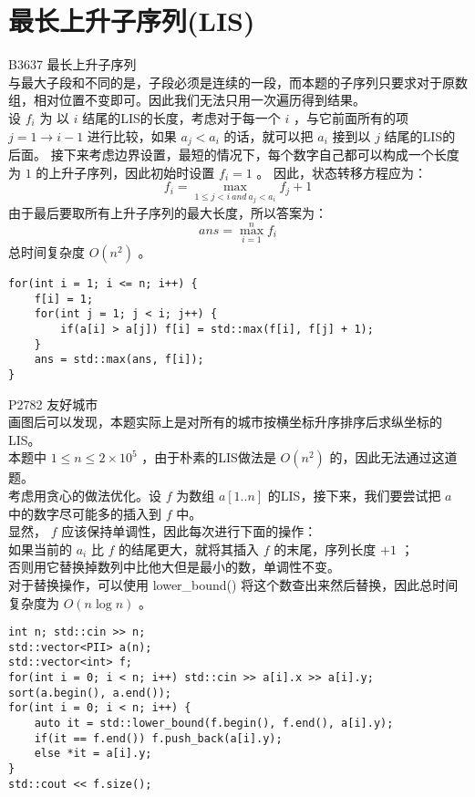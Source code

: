 \documentclass{beamer}
\begin{document}
\section{最长上升子序列(LIS)}
\begin{frame}
B3637 最长上升子序列\\
与最大子段和不同的是，子段必须是连续的一段，而本题的子序列只要求对于原数组，相对位置不变即可。因此我们无法只用一次遍历得到结果。\\ 
设 $f_i$ 为 以 $i$ 结尾的LIS的长度，考虑对于每一个 $i$ ，与它前面所有的项 $j = 1 \rightarrow i - 1$ 进行比较，如果 $a_j < a_i$ 的话，就可以把 $a_i$ 接到以 $j$ 结尾的LIS的后面。
接下来考虑边界设置，最短的情况下，每个数字自己都可以构成一个长度为 $1$ 的上升子序列，因此初始时设置 $f_i = 1$ 。
因此，状态转移方程应为：
$$f_i = \max_{1 \leq j < i \ and \ a_j < a_i}f_j + 1$$
由于最后要取所有上升子序列的最大长度，所以答案为：
$$ans = \max_{i = 1}^{n}f_i$$
总时间复杂度 $O(n^2)$ 。
\end{frame}
\begin{frame}[fragile]
\begin{onlyenv}
\begin{verbatim}
for(int i = 1; i <= n; i++) {
    f[i] = 1;
    for(int j = 1; j < i; j++) {
        if(a[i] > a[j]) f[i] = std::max(f[i], f[j] + 1);
    }
    ans = std::max(ans, f[i]);
}
\end{verbatim}
\end{onlyenv}
\end{frame}
\begin{frame}
P2782 友好城市\\ 
画图后可以发现，本题实际上是对所有的城市按横坐标升序排序后求纵坐标的LIS。\\ 
本题中 $1 \leq n \leq 2 \times 10^5$ ，由于朴素的LIS做法是 $O(n^2)$ 的，因此无法通过这道题。\\
考虑用贪心的做法优化。设 $f$ 为数组 $a[1..n]$ 的LIS，接下来，我们要尝试把 $a$ 中的数字尽可能多的插入到 $f$ 中。\\显然， $f$ 应该保持单调性，因此每次进行下面的操作：\\ 
如果当前的 $a_i$ 比 $f$ 的结尾更大，就将其插入 $f$ 的末尾，序列长度 $+1$ ；\\ 
否则用它替换掉数列中比他大但是最小的数，单调性不变。\\ 
对于替换操作，可以使用 lower\_bound() 将这个数查出来然后替换，因此总时间复杂度为 $O(n \log n)$ 。
\end{frame}
\begin{frame}[fragile]
\begin{onlyenv}
\begin{verbatim}
int n; std::cin >> n;
std::vector<PII> a(n);
std::vector<int> f;
for(int i = 0; i < n; i++) std::cin >> a[i].x >> a[i].y;
sort(a.begin(), a.end());
for(int i = 0; i < n; i++) {
    auto it = std::lower_bound(f.begin(), f.end(), a[i].y);
    if(it == f.end()) f.push_back(a[i].y);
    else *it = a[i].y;
}
std::cout << f.size();
\end{verbatim}
\end{onlyenv}
\end{frame}
\end{document}
